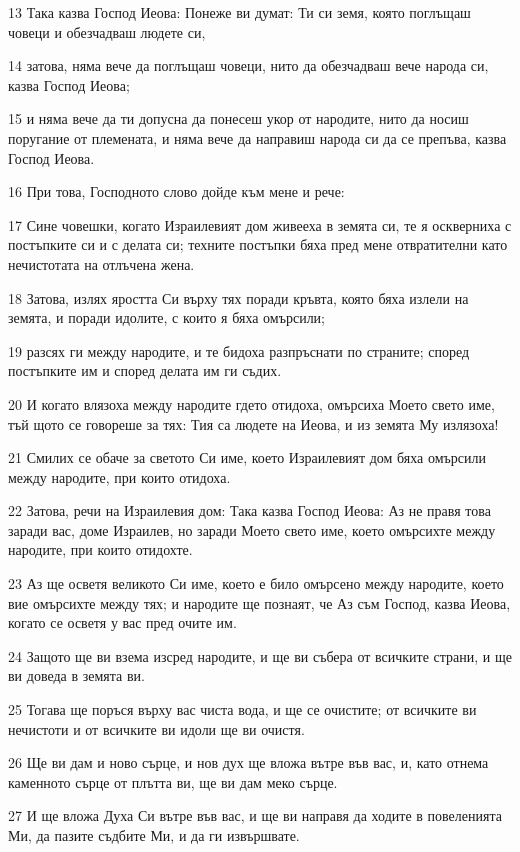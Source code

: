 \par 13 Така казва Господ Иеова: Понеже ви думат: Ти си земя, която поглъщаш човеци и обезчадваш людете си,
\par 14 затова, няма вече да поглъщаш човеци, нито да обезчадваш вече народа си, казва Господ Иеова;
\par 15 и няма вече да ти допусна да понесеш укор от народите, нито да носиш поругание от племената, и няма вече да направиш народа си да се препъва, казва Господ Иеова.
\par 16 При това, Господното слово дойде към мене и рече:
\par 17 Сине човешки, когато Израилевият дом живееха в земята си, те я оскверниха с постъпките си и с делата си; техните постъпки бяха пред мене отвратителни като нечистотата на отлъчена жена.
\par 18 Затова, излях яростта Си върху тях поради кръвта, която бяха излели на земята, и поради идолите, с които я бяха омърсили;
\par 19 разсях ги между народите, и те бидоха разпръснати по страните; според постъпките им и според делата им ги съдих.
\par 20 И когато влязоха между народите гдето отидоха, омърсиха Моето свето име, тъй щото се говореше за тях: Тия са людете на Иеова, и из земята Му излязоха!
\par 21 Смилих се обаче за светото Си име, което Израилевият дом бяха омърсили между народите, при които отидоха.
\par 22 Затова, речи на Израилевия дом: Така казва Господ Иеова: Аз не правя това заради вас, доме Израилев, но заради Моето свето име, което омърсихте между народите, при които отидохте.
\par 23 Аз ще осветя великото Си име, което е било омърсено между народите, което вие омърсихте между тях; и народите ще познаят, че Аз съм Господ, казва Иеова, когато се осветя у вас пред очите им.
\par 24 Защото ще ви взема изсред народите, и ще ви събера от всичките страни, и ще ви доведа в земята ви.
\par 25 Тогава ще поръся върху вас чиста вода, и ще се очистите; от всичките ви нечистоти и от всичките ви идоли ще ви очистя.
\par 26 Ще ви дам и ново сърце, и нов дух ще вложа вътре във вас, и, като отнема каменното сърце от плътта ви, ще ви дам меко сърце.
\par 27 И ще вложа Духа Си вътре във вас, и ще ви направя да ходите в повеленията Ми, да пазите съдбите Ми, и да ги извършвате.
